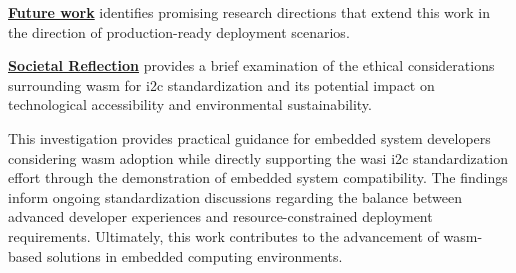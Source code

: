 \textbf{\hyperref[chap:future-work]{Future work}} identifies promising research directions that extend this work in the direction of production-ready deployment scenarios.

\textbf{\hyperref[chap:ethics]{Societal Reflection}} provides a brief examination of the ethical considerations surrounding \acrshort{wasm} for \acrshort{i2c} standardization and its potential impact on technological accessibility and environmental sustainability.

This investigation provides practical guidance for embedded system developers considering \acrshort{wasm} adoption while directly supporting the \acrshort{wasi} \acrshort{i2c} standardization effort through the demonstration of embedded system compatibility. The findings inform ongoing standardization discussions regarding the balance between advanced developer experiences and resource-constrained deployment requirements. Ultimately, this work contributes to the advancement of \acrshort{wasm}-based solutions in embedded computing environments.